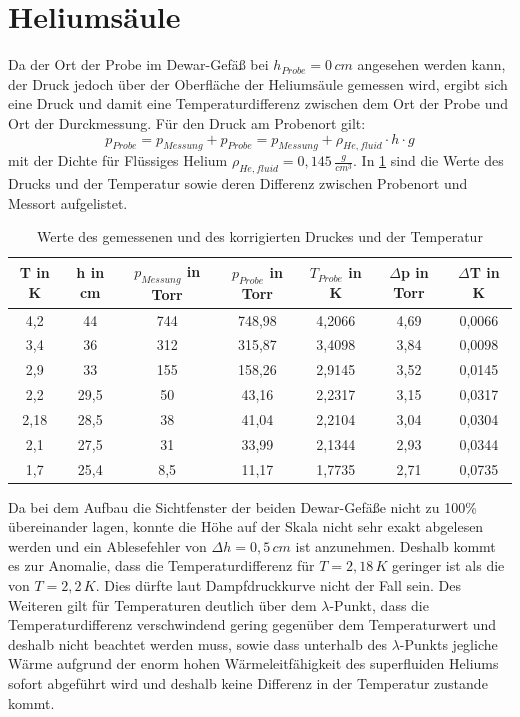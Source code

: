 \documentclass[twoside,colorback,accentcolor=tud4c,11pt]{tudreport}
\begin{document}
\section{Heliumsäule}
Da der Ort der Probe im Dewar-Gefäß bei $h_{Probe}=0\,\si{cm}$ angesehen werden kann, der Druck jedoch über der Oberfläche der Heliumsäule gemessen wird, ergibt sich eine Druck und damit eine Temperaturdifferenz zwischen dem Ort der Probe und Ort der Durckmessung. Für den Druck am Probenort gilt:
\begin{equation}
p_{Probe}=p_{Messung}+p_{Probe}=p_{Messung}+\rho_{He,fluid}\cdot h \cdot g
\end{equation}
mit der Dichte für Flüssiges Helium $\rho_{He,fluid}=0,145\,\si{\frac{g}{cm^3}}$. In \ref{ptkorr} sind die Werte des Drucks und der Temperatur sowie deren Differenz zwischen Probenort und Messort aufgelistet.
\begin{table}[H]
\centering
\begin{tabular}{|c|c|c|c|c|c|c|}
\hline 
T in K & h in cm & $p_{Messung}$ in Torr & $p_{Probe}$ in Torr & $T_{Probe}$ in K & $\Delta$p in Torr & $\Delta$T in K\\ 
\hline 
4,2 & 44 & 744 & 748,98 & 4,2066 & 4,69 & 0,0066 \\ 
\hline 
3,4 & 36 & 312 & 315,87 & 3,4098 & 3,84 & 0,0098 \\ 
\hline 
2,9 & 33 & 155 & 158,26 & 2,9145 & 3,52 & 0,0145 \\ 
\hline 
2,2 & 29,5 & 50 & 43,16 & 2,2317 & 3,15 & 0,0317 \\ 
\hline 
2,18 & 28,5 & 38 & 41,04 & 2,2104 & 3,04 & 0,0304 \\ 
\hline 
2,1 & 27,5 & 31 & 33,99 & 2,1344 & 2,93 & 0,0344 \\ 
\hline 
1,7 & 25,4 & 8,5 & 11,17 & 1,7735 & 2,71 & 0,0735 \\ 
\hline 
\end{tabular}
\caption{Werte des gemessenen und des korrigierten Druckes und der Temperatur}\label{ptkorr}
\end{table} 
Da bei dem Aufbau die Sichtfenster der beiden Dewar-Gefäße nicht zu 100\% übereinander lagen, konnte die Höhe auf der Skala nicht sehr exakt abgelesen werden und ein Ablesefehler von $\Delta h=0,5\,\si{cm}$ ist anzunehmen. Deshalb kommt es zur Anomalie, dass die Temperaturdifferenz für $T=2,18\,\si{K}$ geringer ist als die von $T=2,2\,\si{K}$. Dies dürfte laut Dampfdruckkurve nicht der Fall sein. Des Weiteren gilt für Temperaturen deutlich über dem $\lambda$-Punkt, dass die Temperaturdifferenz verschwindend gering gegenüber dem Temperaturwert und deshalb nicht beachtet werden muss, sowie dass unterhalb des $\lambda$-Punkts jegliche Wärme aufgrund der enorm hohen Wärmeleitfähigkeit des superfluiden Heliums sofort abgeführt wird und deshalb keine Differenz in der Temperatur zustande kommt.
\end{document}
